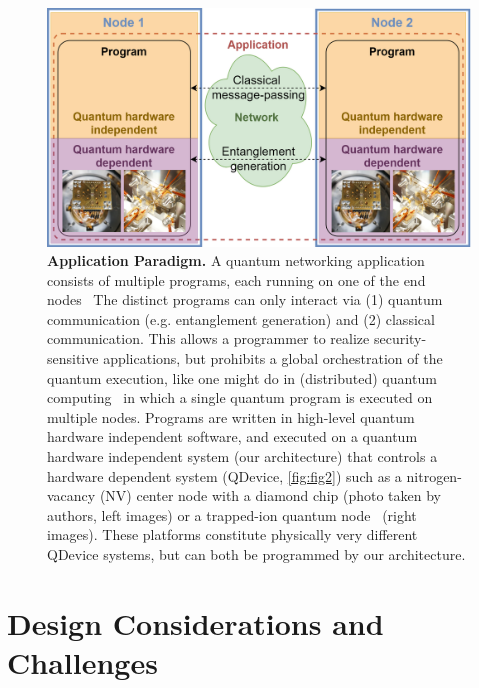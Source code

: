 \begin{figure}
\centering
\includegraphics[width=1\linewidth]{figures/qnodeos/main/fig1/fig1.png}
\caption{\textbf{Application Paradigm.} A quantum networking application consists of multiple programs, each running on one of the end nodes~\cite{dahlberg_2022_netqasm} The distinct programs can only interact via (1) quantum communication (e.g. entanglement generation) and (2) classical communication. This allows a programmer to realize security-sensitive applications, but prohibits a global orchestration of the quantum execution, like one might do in (distributed) quantum computing~\cite{caleffi_distributed_2022} in which a single quantum program is executed on multiple nodes. Programs are written in high-level quantum hardware independent software, and executed on a quantum hardware independent system (our architecture) that controls a hardware dependent system (QDevice, \cref{fig:fig2}) such as a nitrogen-vacancy (NV) center node with a diamond chip (photo taken by authors, left images) or a trapped-ion quantum node~\cite{teller2023integrating} (right images). These platforms constitute physically very different QDevice systems, but can both be programmed by our architecture.}
\label{fig:fig1}
\end{figure}

\section{Design Considerations and Challenges}
